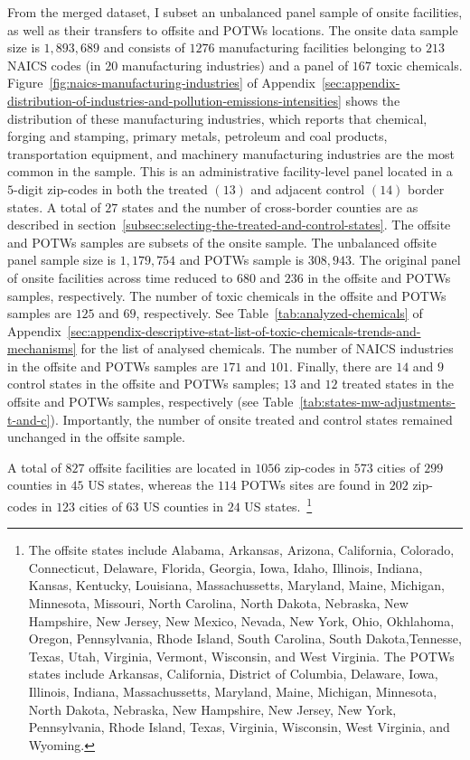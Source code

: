\documentclass[12pt, english]{article}
\begin{document}
    From the merged dataset, I subset an unbalanced panel sample of onsite facilities, as well as their transfers to offsite and POTWs locations. The onsite data sample size is $1,893,689$ and consists of $1276$ manufacturing facilities belonging to $213$ NAICS codes (in $20$ manufacturing industries) and a panel of $167$ toxic chemicals. Figure~\ref{fig:naics-manufacturing-industries} of Appendix~\ref{sec:appendix-distribution-of-industries-and-pollution-emissions-intensities} shows the distribution of these manufacturing industries, which reports that chemical, forging and stamping, primary metals, petroleum and coal products, transportation equipment, and machinery manufacturing industries are the most common in the sample. This is an administrative facility-level panel located in a $5$-digit zip-codes in both the treated $(13)$ and adjacent control $(14)$ border states. A total of $27$ states and the number of cross-border counties are as described in section~\ref{subsec:selecting-the-treated-and-control-states}. The offsite and POTWs samples are subsets of the onsite sample. The unbalanced offsite panel sample size is $1,179,754$ and POTWs sample is $308,943$. The original panel of onsite facilities across time reduced to $680$ and $236$ in the offsite and POTWs samples, respectively. The number of toxic chemicals in the offsite and POTWs samples are $125$ and $69$, respectively. See Table~\ref{tab:analyzed-chemicals} of Appendix~\ref{sec:appendix-descriptive-stat-list-of-toxic-chemicals-trends-and-mechanisms} for the list of analysed chemicals. The number of NAICS industries in the offsite and POTWs samples are $171$ and $101$. Finally, there are $14$ and $9$ control states in the offsite and POTWs samples; $13$ and $12$ treated states in the offsite and POTWs samples, respectively (see Table~\ref{tab:states-mw-adjustments-t-and-c}). Importantly, the number of onsite treated and control states remained unchanged in the offsite sample.

    A total of $827$ offsite facilities are located in $1056$ zip-codes in $573$ cities of $299$ counties in $45$ US states, whereas the $114$ POTWs sites are found in $202$ zip-codes in $123$ cities of $63$ US counties in $24$ US states.~\footnote{\tiny The offsite states include Alabama, Arkansas, Arizona, California, Colorado, Connecticut, Delaware, Florida, Georgia, Iowa, Idaho, Illinois, Indiana, Kansas, Kentucky, Louisiana, Massachussetts, Maryland, Maine, Michigan, Minnesota, Missouri, North Carolina, North Dakota, Nebraska, New Hampshire, New Jersey, New Mexico, Nevada, New York, Ohio, Okhlahoma, Oregon, Pennsylvania, Rhode Island, South Carolina, South Dakota,Tennesse, Texas, Utah, Virginia, Vermont, Wisconsin, and West Virginia. The POTWs states include Arkansas, California, District of Columbia, Delaware, Iowa, Illinois, Indiana, Massachussetts, Maryland, Maine, Michigan, Minnesota, North Dakota, Nebraska, New Hampshire, New Jersey, New York, Pennsylvania, Rhode Island, Texas, Virginia, Wisconsin, West Virginia, and Wyoming.}
\end{document}
